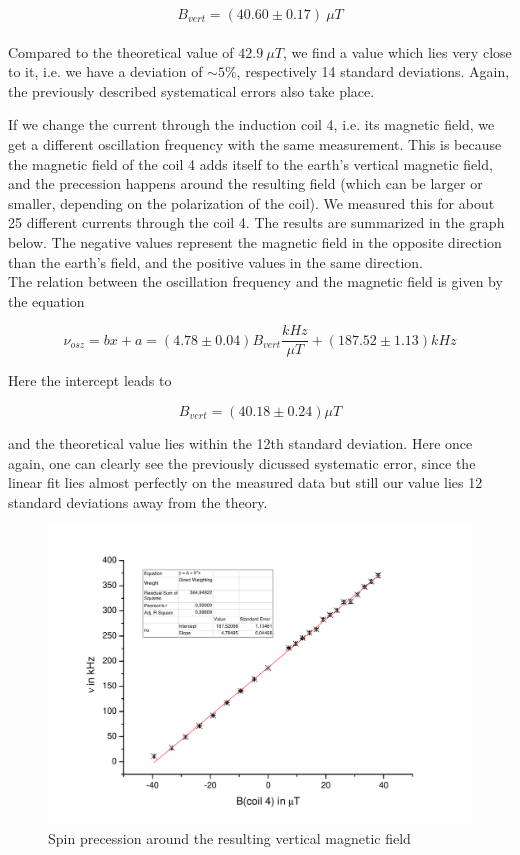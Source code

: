 $$\boxed{ B_{vert} = (40.60 \pm 0.17)\ \mu T }$$\\

Compared to the theoretical value of $42.9\ \mu T$, we find a value which lies very close to it, i.e. we have a deviation of $\sim 5\%$, respectively 14 standard deviations. Again, the previously described systematical errors also take place.

If we change the current through the induction coil 4, i.e. its magnetic field, we get a different oscillation frequency with the same measurement. This is because the magnetic field of the coil 4 adds itself to the earth's vertical magnetic field, and the precession happens around the resulting field (which can be larger or smaller, depending on the polarization of the coil).  We measured this for about 25 different currents through the coil 4. The results are summarized in the graph below. The negative values represent the magnetic field in the opposite direction than the earth's field, and the positive values in the same direction.\\

The relation between the oscillation frequency and the magnetic field is given by the equation

$$\nu_{osz} = bx + a = (4.78\pm0.04)B_{vert}\frac{kHz}{\mu T} + (187.52\pm1.13)kHz$$

Here the intercept leads to

$$B_{vert} = (40.18 \pm 0.24)\mu T$$

and the theoretical value lies within the 12th standard deviation. Here once again, one can clearly see the previously dicussed systematic error, since the linear fit lies almost perfectly on the measured data but still our value lies 12 standard deviations away from the theory.

\begin{figure}[H]
\centering \includegraphics[width=1.1\textwidth]{BilderAusw/praezfeld.pdf}
\caption{Spin precession around the resulting vertical magnetic field}
\end{figure}

